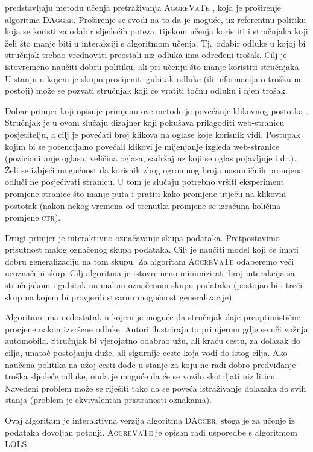 \citet{ross2014reinforcement} predstavljaju metodu učenja pretraživanja
\textsc{AggreVaTe} , koja je
proširenje algoritma \textsc{DAgger}. Proširenje se svodi na to da je moguće, uz
referentnu politiku koja se koristi za odabir sljedećih poteza, tijekom učenja
koristiti i stručnjaka koji želi što manje biti u interakciji s algoritmom
učenja. Tj.~odabir odluke u kojoj bi stručnjak trebao vrednovati preostali
niz odluka ima određeni trošak. Cilj je istovremeno naučiti dobru politiku, ali
pri učenju što manje koristiti stručnjaka. U stanju u kojem je skupo procijeniti
gubitak odluke (ili informacija o trošku ne postoji) može se pozvati stručnjak
koji će vratiti točnu odluku i njen trošak.

Dobar primjer koji opisuje primjenu ove metode je povećanje klikovnog postotka
. Stručnjak je u ovom slučaju dizajner koji
pokušava prilagoditi web-stranicu posjetitelju, a cilj je povećati broj klikova
na oglase koje korisnik vidi. Postupak kojim bi se potencijalno povećali klikovi
je mijenjanje izgleda web-stranice (pozicioniranje oglasa, veličina oglasa,
sadržaj uz koji se oglas pojavljuje i dr.). Želi se izbjeći mogućnost da
korisnik zbog ogromnog broja nasumičnih promjena odluči ne posjećivati stranicu.
U tom je slučaju potrebno vršiti eksperiment promjene stranice što manje puta i
pratiti kako promjene utječu na klikovni postotak (nakon nekog vremena od
trenutka promjene se izračuna količina promjene \textsc{ctr}).

Drugi primjer je interaktivno označavanje skupa podataka. Pretpostavimo
prisutnost malog označenog skupa podataka. Cilj je naučiti model koji će imati
dobru generalizaciju na tom skupu. Za algoritam \textsc{AggreVaTe} odaberemo
veći neoznačeni skup. Cilj algoritma je istovremeno minimizirati broj
interakcija sa stručnjakom i gubitak na malom označenom skupu podataka (postojao
bi i treći skup na kojem bi provjerili stvarnu mogućnost generalizacije).

Algoritam ima nedostatak u kojem je moguće da stručnjak daje preoptimistične
procjene nakon izvršene odluke. Autori ilustriraju to primjerom gdje se uči
vožnja automobila. Stručnjak bi vjerojatno odabrao užu, ali kraću cestu, za
dolazak do cilja, unatoč postojanju duže, ali sigurnije ceste koja vodi do istog
cilja. Ako naučena politika na užoj cesti dođe u stanje za koju ne radi dobro
predviđanje troška sljedeće odluke, onda je moguće da će se vozilo skotrljati
niz liticu. Navedeni problem može se riješiti tako da se poveća istraživanje
dolazaka do svih stanja (problem je ekvivalentan pristranosti oznakama).

Ovaj algoritam je interaktivna verzija algoritma \textsc{DAgger}, stoga je za
učenje iz podataka dovoljan potonji. \textsc{AggreVaTe} je opisan radi usporedbe
s algoritmom \textsc{LOLS}.
